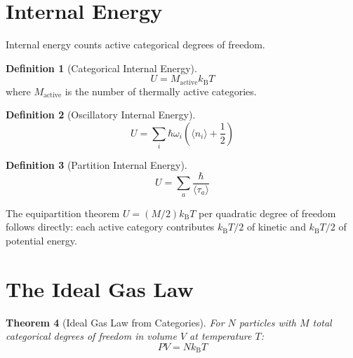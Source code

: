 \documentclass[twocolumn,10pt]{article}
\newtheorem{theorem}{Theorem}[section]
\theoremstyle{definition}
\newtheorem{definition}[theorem]{Definition}
\theoremstyle{remark}
\newcommand{\kB}{k_{\mathrm{B}}}
\begin{document}
\section{Internal Energy}
\label{sec:internal_energy}

Internal energy counts active categorical degrees of freedom.

\begin{definition}[Categorical Internal Energy]
\begin{equation}
U = M_{\text{active}} \kB T
\label{eq:categorical_U}
\end{equation}
where $M_{\text{active}}$ is the number of thermally active categories.
\end{definition}

\begin{definition}[Oscillatory Internal Energy]
\begin{equation}
U = \sum_i \hbar\omega_i \left(\langle n_i \rangle + \frac{1}{2}\right)
\label{eq:oscillatory_U}
\end{equation}
\end{definition}

\begin{definition}[Partition Internal Energy]
\begin{equation}
U = \sum_a \frac{\hbar}{\langle\tau_a\rangle}
\label{eq:partition_U}
\end{equation}
\end{definition}

The equipartition theorem $U = (M/2)\kB T$ per quadratic degree of freedom follows directly: each active category contributes $\kB T/2$ of kinetic and $\kB T/2$ of potential energy.

\section{The Ideal Gas Law}
\label{sec:ideal_gas}

\begin{theorem}[Ideal Gas Law from Categories]
\label{thm:ideal_gas}
For $N$ particles with $M$ total categorical degrees of freedom in volume $V$ at temperature $T$:
\begin{equation}
PV = N\kB T
\label{eq:ideal_gas}
\end{equation}
\end{theorem}
\end{document}
